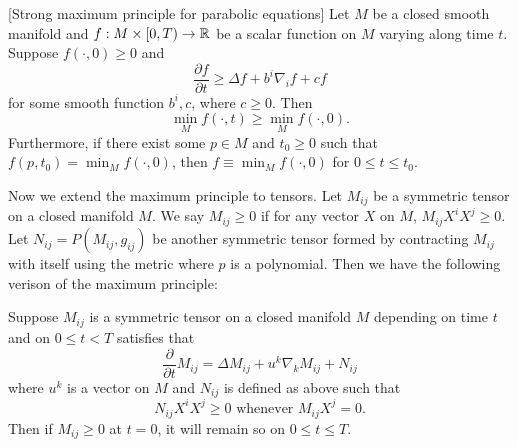 \begin{theorem} \label{thm:MPP}[Strong maximum principle for parabolic equations]
	Let $M$ be a closed smooth manifold and $f: M \times [0,T) \to \mathbb{R}$ be a scalar function on $M$ varying along time $t$. Suppose $f (\cdot,0) \geq 0$ and
	\[
		\frac{\partial f}{\partial t} \geq \Delta f + b^{i} \nabla_{i}^{} f+ cf
	\]
	for some smooth function $b^i,c$, where $c \geq 0.$ Then
	\[\min _M f (\cdot,t) \geq \min _M f (\cdot,0).\]
	Furthermore, if there exist some $p \in M$ and $t_0 \geq 0$ such that $f(p,t_0)=\min _M f (\cdot,0) $, then $f \equiv \min _M f (\cdot,0)$ for $0 \leq t \leq t_0.$
\end{theorem}

Now we extend the maximum principle to tensors. Let $M_{ij}$ be a symmetric tensor on a closed manifold $M$. We say $M_{ij }^{} \geq 0 $ if for any vector $X$ on $M$, $M_{ij }^{} X^i X^j \geq 0$. Let $N_{ij }^{} = P(M_{ij }^{} , g_{ij}^{} )$ be another symmetric tensor formed by contracting $M_{ij }^{} $ with itself using the metric where $p$ is a polynomial. Then we have the following verison of the maximum principle:

\begin{theorem} \label{thm:MP2T}
	Suppose $M_{ij }^{} $ is a symmetric tensor on a closed manifold $M$ depending on time $t$ and on $0 \leq t < T$ satisfies that \[\frac{\partial }{\partial t} M_{ij }^{} = \Delta M_{ij }^{} + u^k \nabla_{k}^{} M_{ij }^{} + N_{ij }^{} \] where $u^k$ is a vector on $M$ and $N_{ij }^{} $ is defined as above such that 
	\[
		N_{ij }^{} X^i X^j \geq 0 \text{   whenever  } M_{ij }^{} X^j =0.
	\]
	Then if $M_{ij }^{} \geq 0$ at $t=0$, it will remain so on $0 \leq t \leq T$.
\end{theorem}


